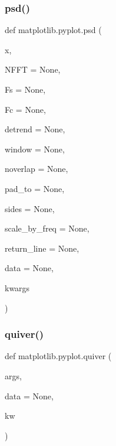 \mbox{\label{namespacematplotlib_1_1pyplot_ace852c1c661edc5f793c2a53f192c707}} 
\subsubsection{\texorpdfstring{psd()}{psd()}}
{\footnotesize\ttfamily def matplotlib.\+pyplot.\+psd (\begin{DoxyParamCaption}\item[{}]{x,  }\item[{}]{N\+F\+FT = {\ttfamily None},  }\item[{}]{Fs = {\ttfamily None},  }\item[{}]{Fc = {\ttfamily None},  }\item[{}]{detrend = {\ttfamily None},  }\item[{}]{window = {\ttfamily None},  }\item[{}]{noverlap = {\ttfamily None},  }\item[{}]{pad\+\_\+to = {\ttfamily None},  }\item[{}]{sides = {\ttfamily None},  }\item[{}]{scale\+\_\+by\+\_\+freq = {\ttfamily None},  }\item[{}]{return\+\_\+line = {\ttfamily None},  }\item[{}]{data = {\ttfamily None},  }\item[{}]{kwargs }\end{DoxyParamCaption})}

\mbox{\label{namespacematplotlib_1_1pyplot_a94c1ec9ca6263cecbb04c1e7cd4c72cd}} 
\subsubsection{\texorpdfstring{quiver()}{quiver()}}
{\footnotesize\ttfamily def matplotlib.\+pyplot.\+quiver (\begin{DoxyParamCaption}\item[{}]{args,  }\item[{}]{data = {\ttfamily None},  }\item[{}]{kw }\end{DoxyParamCaption})}

